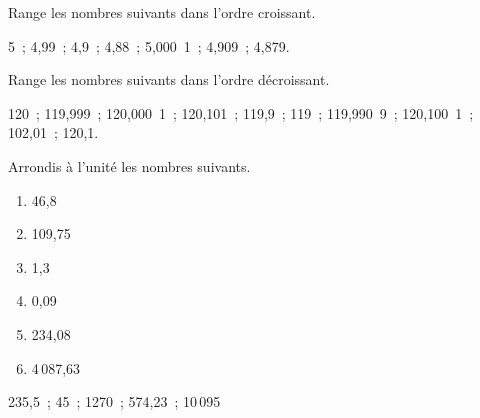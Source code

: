 \begin{exercice}[Rangement]
Range les nombres suivants dans l'ordre croissant.

5 ; 4,99 ; 4,9 ; 4,88 ; 5,000 1 ; 4,909 ; 4,879.

\dotfill

\dotfill
\end{exercice}


\begin{exercice}
Range les nombres suivants dans l'ordre décroissant.

120 ; 119,999 ; 120,000 1 ; 120,101 ; 119,9 ; 119 ; 119,990 9 ; 120,100 1 ; 102,01 ; 120,1.

\dotfill

\dotfill
\end{exercice}



\begin{exercice}
Arrondis à l'unité les nombres suivants.
\begin{enumerate}
 \item 46,8 \dotfill \hspace*{13em}
 
 \item 109,75 \dotfill \hspace*{13em}
 
 \item 1,3 \dotfill \hspace*{13em}
 
 \item 0,09 \dotfill \hspace*{13em}
 
 \item 234,08 \dotfill \hspace*{13em}
 
 \item 4\,087,63 \dotfill \hspace*{13em}
 
 \end{enumerate}
\end{exercice}




\begin{exercice}
235,5 ; 45 ; 1270 ; 574,23 ; 10\,095
\end{exercice}


